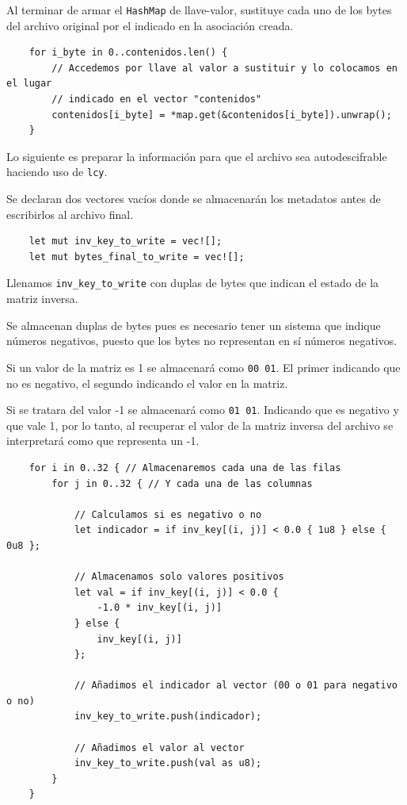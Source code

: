 \documentclass[a4paper]{article}
\begin{document}
Al terminar de armar el \texttt{HashMap} de llave-valor, sustituye cada uno de
los bytes del archivo original por el indicado en la asociación creada.

\begin{verbatim}
    for i_byte in 0..contenidos.len() {
        // Accedemos por llave al valor a sustituir y lo colocamos en el lugar
        // indicado en el vector "contenidos"
        contenidos[i_byte] = *map.get(&contenidos[i_byte]).unwrap();
    }
\end{verbatim}

Lo siguiente es preparar la información para que el archivo sea autodescifrable
haciendo uso de \texttt{lcy}.

Se declaran dos vectores vacíos donde se almacenarán los metadatos antes de
escribirlos al archivo final.

\begin{verbatim}
    let mut inv_key_to_write = vec![];
    let mut bytes_final_to_write = vec![];
\end{verbatim}

Llenamos \texttt{inv\_key\_to\_write} con duplas de bytes que indican el estado
de la matriz inversa.

Se almacenan duplas de bytes pues es necesario tener un sistema que indique
números negativos, puesto que los bytes no representan en sí números negativos.

Si un valor de la matriz es 1 se almacenará como \texttt{00 01}. El primer
 indicando que no es negativo, el segundo indicando el valor en la
matriz.

Si se tratara del valor -1 se almacenará como \texttt{01 01}. Indicando que es
negativo y que vale 1, por lo tanto, al recuperar el valor de la matriz inversa
del archivo se interpretará como que representa un -1.

\begin{verbatim}
    for i in 0..32 { // Almacenaremos cada una de las filas
        for j in 0..32 { // Y cada una de las columnas
        
            // Calculamos si es negativo o no
            let indicador = if inv_key[(i, j)] < 0.0 { 1u8 } else { 0u8 };
            
            // Almacenamos solo valores positivos
            let val = if inv_key[(i, j)] < 0.0 {
                -1.0 * inv_key[(i, j)]
            } else {
                inv_key[(i, j)]
            };

            // Añadimos el indicador al vector (00 o 01 para negativo o no)
            inv_key_to_write.push(indicador);
            
            // Añadimos el valor al vector
            inv_key_to_write.push(val as u8);
        }
    }
\end{verbatim}
\end{document}
